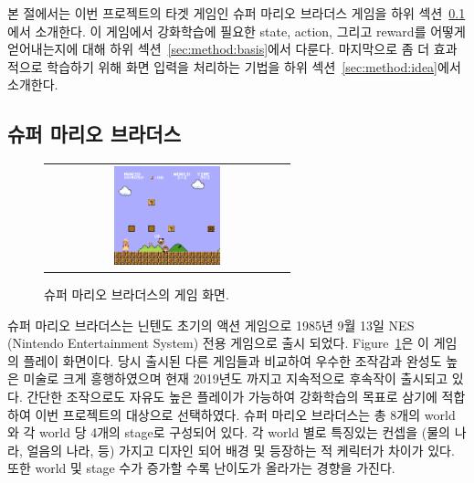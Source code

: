 본 절에서는 이번 프로젝트의 타겟 게임인 슈퍼 마리오 브라더스 게임을 하위 섹션~\ref{sec:method:smb}에서 소개한다.
이 게임에서 강화학습에 필요한 state, action, 그리고 reward를 어떻게 얻어내는지에 대해 하위 섹션~\ref{sec:method:basis}에서 다룬다.
마지막으로 좀 더 효과적으로 학습하기 위해 화면 입력을 처리하는 기법을 하위 섹션~\ref{sec:method:idea}에서 소개한다.

\subsection{슈퍼 마리오 브라더스}
\label{sec:method:smb}

\begin{figure}[h]
\begin{center}
\begin{tabular}{c}
     \includegraphics[width=0.45\textwidth]{FIG/SuperMarioBros.png} \\
\end{tabular}
\caption{
	슈퍼 마리오 브라더스의 게임 화면.
}
\label{fig:mario_title}
\end{center}
\end{figure}

슈퍼 마리오 브라더스는 닌텐도 초기의 액션 게임으로 1985년 9월 13일 NES (Nintendo Entertainment System) 전용 게임으로 출시 되었다.
Figure~\ref{fig:mario_title}은 이 게임의 플레이 화면이다.
당시 출시된 다른 게임들과 비교하여 우수한 조작감과 완성도 높은 미술로 크게 흥행하였으며 현재 2019년도 까지고 지속적으로 후속작이 출시되고 있다.
간단한 조작으로도 자유도 높은 플레이가 가능하여 강화학습의 목표로 삼기에 적합하여 이번 프로젝트의 대상으로 선택하였다.
슈퍼 마리오 브라더스는 총 8개의 world 와 각 world 당 4개의 stage로 구성되어 있다.
각 world 별로 특징있는 컨셉을 (물의 나라, 얼음의 나라, 등) 가지고 디자인 되어 배경 및 등장하는 적 케릭터가 차이가 있다.
또한 world 및 stage 수가 증가할 수록 난이도가 올라가는 경향을 가진다.

